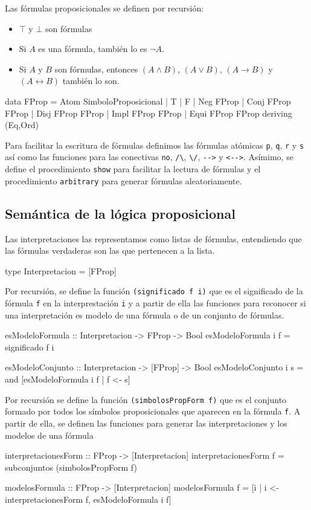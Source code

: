 \documentclass{llncs}
\newcommand{\lif}{\to}
\newcommand{\liff}{\leftrightarrow}
\begin{document}
Las fórmulas proposicionales se definen por recursión:
\begin{itemize}
\item $\top$ y $\bot$ son fórmulas
\item Si $A$ es una fórmula, también lo es $\neg A$.
\item Si $A$ y $B$ son fórmulas, entonces $(A \land B)$, $(A \lor B)$, 
  $(A \lif B)$ y $(A \liff B)$ también lo son.
\end{itemize}
\begin{code}
data FProp = Atom SimboloProposicional
           | T
           | F
           | Neg FProp 
           | Conj FProp FProp 
           | Disj FProp FProp 
           | Impl FProp FProp 
           | Equi FProp FProp 
           deriving (Eq,Ord)
\end{code}

Para facilitar la escritura de fórmulas definimos las fórmulas atómicas
\verb|p|, \verb|q|, \verb|r| y \verb|s| así como las funciones para las
conectivas \verb|no|, \verb|/\|, \verb|\/|, \verb|-->| y \verb|<-->|.
Asímimo, se define el procedimiento \verb|show| para facilitar la lectura de
fórmulas y el procedimiento \verb|arbitrary| para generar fórmulas
aleatoriamente.

\subsection{Semántica de la lógica proposicional}
Las interpretaciones las representamos como listas de fórmulas, entendiendo
que las fórmulas verdaderas son las que pertenecen a la lista.
\begin{code}
type Interpretacion = [FProp]
\end{code}

Por recursión, se define la función \verb|(significado f i)| que es el
significado de la fórmula \verb|f| en la interprestación \verb|i|
y a partir de ella las funciones para reconocer si una interpretación es
modelo de una fórmula o de un conjunto de fórmulas.
\begin{code}
esModeloFormula :: Interpretacion -> FProp -> Bool
esModeloFormula i f = significado f i 

esModeloConjunto :: Interpretacion -> [FProp] -> Bool
esModeloConjunto i s =
    and [esModeloFormula i f | f <- s]
\end{code}

Por recursión se define la función \verb|(simbolosPropForm f)| que es el
conjunto formado por todos los símbolos proposicionales que aparecen en la
fórmula \verb|f|. A partir de ella, se definen las funciones para generar las
interpretaciones y los modelos de una fórmula
\begin{code}
interpretacionesForm :: FProp -> [Interpretacion]
interpretacionesForm f = subconjuntos (simbolosPropForm f)

modelosFormula :: FProp -> [Interpretacion]
modelosFormula f =
    [i | i <- interpretacionesForm f, esModeloFormula i f]
\end{code}
\end{document}
